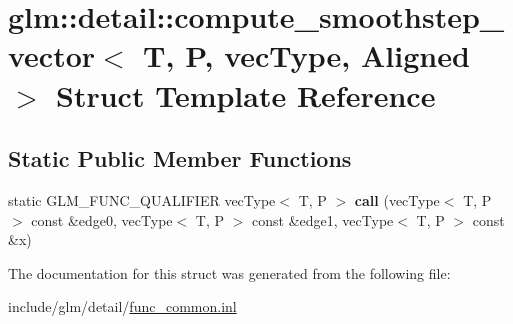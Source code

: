 \hypertarget{structglm_1_1detail_1_1compute__smoothstep__vector}{}\section{glm\+:\+:detail\+:\+:compute\+\_\+smoothstep\+\_\+vector$<$ T, P, vec\+Type, Aligned $>$ Struct Template Reference}
\label{structglm_1_1detail_1_1compute__smoothstep__vector}
\subsection*{Static Public Member Functions}
\begin{DoxyCompactItemize}
\item 
\mbox{\label{structglm_1_1detail_1_1compute__smoothstep__vector_a73d7edc2631135b93a5855f4804b524e}} 
static G\+L\+M\+\_\+\+F\+U\+N\+C\+\_\+\+Q\+U\+A\+L\+I\+F\+I\+ER vec\+Type$<$ T, P $>$ {\bfseries call} (vec\+Type$<$ T, P $>$ const \&edge0, vec\+Type$<$ T, P $>$ const \&edge1, vec\+Type$<$ T, P $>$ const \&x)
\end{DoxyCompactItemize}


The documentation for this struct was generated from the following file\+:\begin{DoxyCompactItemize}
\item 
include/glm/detail/\hyperlink{func__common_8inl}{func\+\_\+common.\+inl}\end{DoxyCompactItemize}
